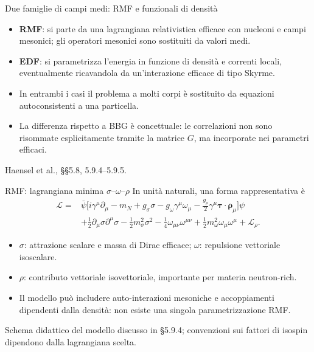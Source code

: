 \begin{frame}[t]{Due famiglie di campi medi: RMF e funzionali di densità}
\small
\begin{itemize}
\item \textbf{RMF}: si parte da una lagrangiana relativistica efficace con nucleoni e campi mesonici; gli operatori mesonici sono sostituiti da valori medi.
\item \textbf{EDF}: si parametrizza l'energia in funzione di densità e correnti locali, eventualmente ricavandola da un'interazione efficace di tipo Skyrme.
\item In entrambi i casi il problema a molti corpi è sostituito da equazioni autoconsistenti a una particella.
\item La differenza rispetto a BBG è concettuale: le correlazioni non sono risommate esplicitamente tramite la matrice $G$, ma incorporate nei parametri efficaci.
\end{itemize}
{\footnotesize Haensel et al., §§5.8, 5.9.4--5.9.5.}
\end{frame}

\begin{frame}[t]{RMF: lagrangiana minima $\sigma$--$\omega$--$\rho$}
\footnotesize
In unità naturali, una forma rappresentativa è
\[
\begin{aligned}
\mathcal L={}&\bar\psi\bigl[i\gamma^\mu\partial_\mu-m_N
+g_\sigma\sigma-g_\omega\gamma^\mu\omega_\mu
-\tfrac{g_\rho}{2}\gamma^\mu\boldsymbol\tau\!\cdot\!\boldsymbol\rho_\mu\bigr]\psi\\
&+\tfrac12\partial_\mu\sigma\partial^\mu\sigma-\tfrac12m_\sigma^2\sigma^2
-\tfrac14\omega_{\mu\nu}\omega^{\mu\nu}
+\tfrac12m_\omega^2\omega_\mu\omega^\mu+\mathcal L_\rho .
\end{aligned}
\]
\begin{itemize}
\item $\sigma$: attrazione scalare e massa di Dirac efficace; $\omega$: repulsione vettoriale isoscalare.
\item $\rho$: contributo vettoriale isovettoriale, importante per materia neutron-rich.
\item Il modello può includere auto-interazioni mesoniche e accoppiamenti dipendenti dalla densità: non esiste una singola parametrizzazione RMF.
\end{itemize}
{\footnotesize Schema didattico del modello discusso in §5.9.4; convenzioni sui fattori di isospin dipendono dalla lagrangiana scelta.}
\end{frame}

